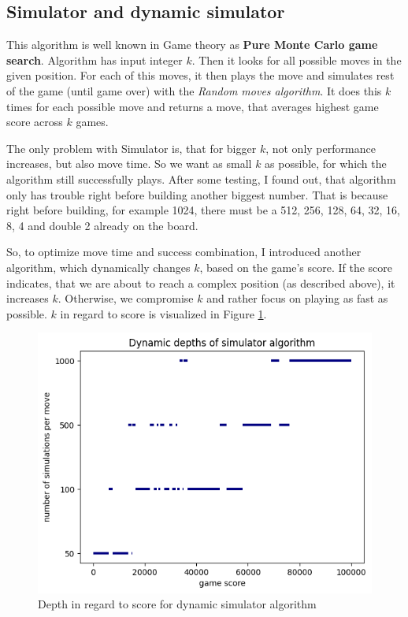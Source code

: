 \documentclass[sigconf,nonacm]{acmart}
\begin{document}
\subsection{Simulator and dynamic simulator}

This algorithm is well known in Game theory as \textbf{Pure Monte Carlo game search}. Algorithm has input integer $k$. Then it looks for all possible moves in the given position.
For each of this moves, it then plays the move and simulates rest of the game (until game over) with the \textit{Random moves algorithm}. It does this $k$ times for each possible move and returns a move, that averages highest game score across $k$ games.

The only problem with Simulator is, that for bigger $k$, not only performance increases, but also move time. So we want as small $k$ as possible, for which the algorithm still successfully plays. After some testing, I found out, that algorithm only has trouble right before building another biggest number. That is because right before building, for example 1024, there must be a 512, 256, 128, 64, 32, 16, 8, 4 and double 2 already on the board.

So, to optimize move time and success combination, I introduced another algorithm, which dynamically changes $k$, based on the game's score. If the score indicates, that we are about to reach a complex position (as described above), it increases $k$. Otherwise, we compromise $k$ and rather focus on playing as fast as possible. $k$ in regard to score is visualized in Figure \ref{fig:dynamic_depth}.

\begin{figure}[!ht]
    \centering
    \begin{adjustbox}{scale=0.45}
    \includegraphics{static/dynamic_sim.png}
    \end{adjustbox}
    \caption{Depth in regard to score for dynamic simulator algorithm}
    \label{fig:dynamic_depth}
\end{figure}
\end{document}
